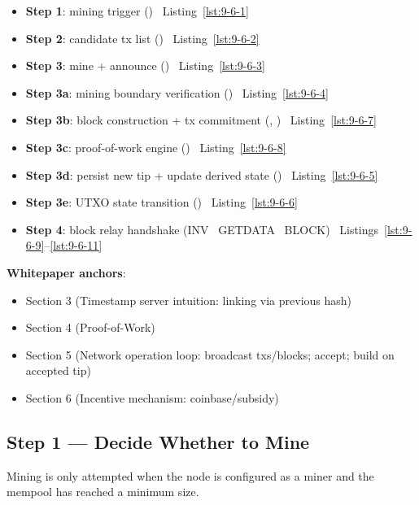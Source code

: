 \begin{itemize}
  \item \textbf{Step 1}: mining trigger () \textrightarrow\ Listing~\ref{lst:9-6-1}
  \item \textbf{Step 2}: candidate tx list () \textrightarrow\ Listing~\ref{lst:9-6-2}
  \item \textbf{Step 3}: mine + announce () \textrightarrow\ Listing~\ref{lst:9-6-3}
  \item \textbf{Step 3a}: mining boundary verification () \textrightarrow\ Listing~\ref{lst:9-6-4}
  \item \textbf{Step 3b}: block construction + tx commitment (, ) \textrightarrow\ Listing~\ref{lst:9-6-7}
  \item \textbf{Step 3c}: proof-of-work engine () \textrightarrow\ Listing~\ref{lst:9-6-8}
  \item \textbf{Step 3d}: persist new tip + update derived state () \textrightarrow\ Listing~\ref{lst:9-6-5}
  \item \textbf{Step 3e}: UTXO state transition () \textrightarrow\ Listing~\ref{lst:9-6-6}
  \item \textbf{Step 4}: block relay handshake (INV \textrightarrow\ GETDATA \textrightarrow\ BLOCK) \textrightarrow\ Listings~\ref{lst:9-6-9}--\ref{lst:9-6-11}
\end{itemize}

\textbf{Whitepaper anchors}:
\begin{itemize}
  \item Section 3 (Timestamp server intuition: linking via previous hash)
  \item Section 4 (Proof-of-Work)
  \item Section 5 (Network operation loop: broadcast txs/blocks; accept; build on accepted tip)
  \item Section 6 (Incentive mechanism: coinbase/subsidy)
\end{itemize}

\subsection{Step 1 --- Decide Whether to Mine}
\label{sec:ch09-6-step1}

Mining is only attempted when the node is configured as a miner and the mempool has reached a minimum size.

